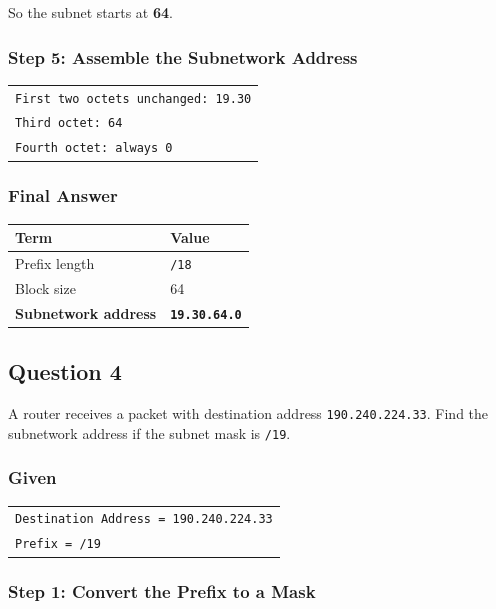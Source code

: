 \documentclass[11pt,a4paper]{article}
\begin{document}
So the subnet starts at \textbf{64}.

\subsubsection*{Step 5: Assemble the Subnetwork Address}

\begin{tabularx}{\textwidth}{@{}X@{}}
\texttt{First two octets unchanged: 19.30} \\
\texttt{Third octet: 64} \\
\texttt{Fourth octet: always 0} \\
\end{tabularx}

\subsubsection*{Final Answer}

\begin{tabularx}{\textwidth}{@{}lX@{}}
\toprule
\rowcolor{tablehead}\textbf{Term} & \textbf{Value} \\
\midrule
Prefix length & \texttt{/18} \\
Block size & 64 \\
\textbf{Subnetwork address} & \textbf{\texttt{19.30.64.0}} \\
\bottomrule
\end{tabularx}

\subsection*{Question 4}

A router receives a packet with destination address \texttt{190.240.224.33}. Find the
subnetwork address if the subnet mask is \texttt{/19}.

\subsubsection*{Given}

\begin{tabularx}{\textwidth}{@{}X@{}}
\texttt{Destination Address = 190.240.224.33} \\
\texttt{Prefix = /19} \\
\end{tabularx}

\subsubsection*{Step 1: Convert the Prefix to a Mask}
\end{document}
